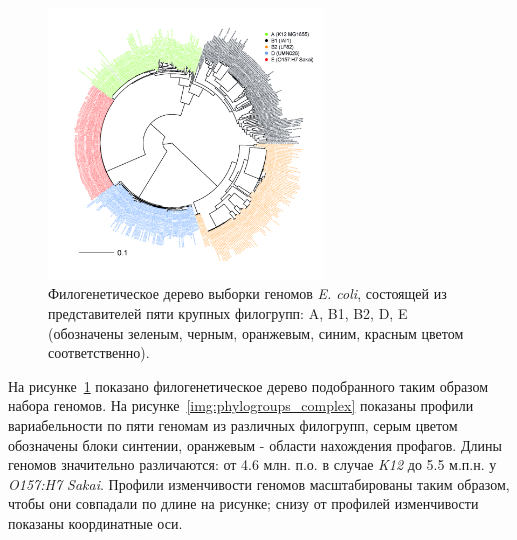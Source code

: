 \begin{figure}[!ht] 
  \center
    \includegraphics[width=0.65\textwidth]{Dissertation/images/complexity/coli_phylogroups.png}
  \caption{Филогенетическое дерево выборки геномов \textit{E. coli}, состоящей из представителей пяти крупных филогрупп: A, B1, B2, D, E (обозначены зеленым, черным, оранжевым, синим, красным цветом соответственно).}
  \label{img:phylogroups} 
\end{figure}

На рисунке~\ref{img:phylogroups} показано филогенетическое дерево подобранного таким образом набора геномов. На рисунке~\ref{img:phylogroups_complex} показаны профили вариабельности по пяти геномам из различных филогрупп, серым цветом обозначены блоки синтении, оранжевым - области нахождения профагов. Длины геномов значительно различаются: от 4.6 млн. п.о. в случае \textit{K12} до 5.5 м.п.н. у \textit{O157:H7 Sakai}. Профили изменчивости геномов масштабированы таким образом, чтобы они совпадали по длине на рисунке; снизу от профилей изменчивости показаны координатные оси.

